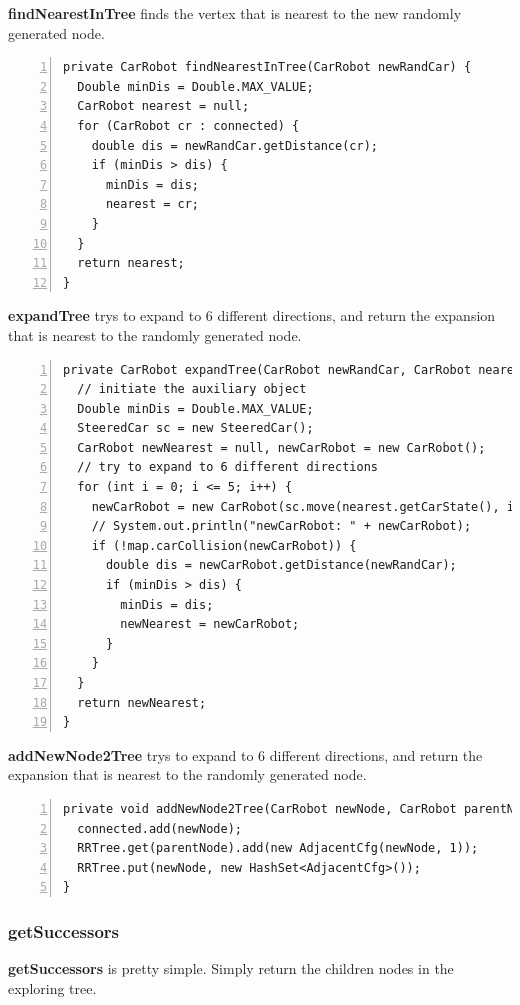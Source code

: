 \documentclass{article}
\begin{document}
\textbf{findNearestInTree} finds the vertex that is nearest to the new randomly generated node.

\begin{lstlisting}[numbers=left]
private CarRobot findNearestInTree(CarRobot newRandCar) {
  Double minDis = Double.MAX_VALUE;
  CarRobot nearest = null;
  for (CarRobot cr : connected) {
    double dis = newRandCar.getDistance(cr);
    if (minDis > dis) {
      minDis = dis;
      nearest = cr;
    }
  }
  return nearest;
}
\end{lstlisting}

\textbf{expandTree} trys to expand to 6 different directions, and return the expansion that is nearest to the randomly generated node.

\begin{lstlisting}[numbers=left]
private CarRobot expandTree(CarRobot newRandCar, CarRobot nearest) {
  // initiate the auxiliary object
  Double minDis = Double.MAX_VALUE;
  SteeredCar sc = new SteeredCar();
  CarRobot newNearest = null, newCarRobot = new CarRobot();
  // try to expand to 6 different directions
  for (int i = 0; i <= 5; i++) {
    newCarRobot = new CarRobot(sc.move(nearest.getCarState(), i, 1.));
    // System.out.println("newCarRobot: " + newCarRobot);
    if (!map.carCollision(newCarRobot)) {
      double dis = newCarRobot.getDistance(newRandCar);
      if (minDis > dis) {
        minDis = dis;
        newNearest = newCarRobot;
      }
    }
  }
  return newNearest;
}

\end{lstlisting}

\textbf{addNewNode2Tree} trys to expand to 6 different directions, and return the expansion that is nearest to the randomly generated node.

\begin{lstlisting}[numbers=left]
private void addNewNode2Tree(CarRobot newNode, CarRobot parentNode) {
  connected.add(newNode);
  RRTree.get(parentNode).add(new AdjacentCfg(newNode, 1));
  RRTree.put(newNode, new HashSet<AdjacentCfg>());
}
\end{lstlisting}





\subsubsection{getSuccessors}

\textbf{getSuccessors} is pretty simple. Simply return the children nodes in the exploring tree.
\end{document}
